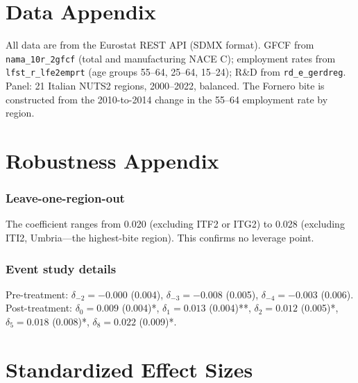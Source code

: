 \documentclass[12pt]{article}
\begin{document}
\section{Data Appendix}

All data are from the Eurostat REST API (SDMX format). GFCF from \texttt{nama\_10r\_2gfcf} (total and manufacturing NACE C); employment rates from \texttt{lfst\_r\_lfe2emprt} (age groups 55--64, 25--64, 15--24); R\&D from \texttt{rd\_e\_gerdreg}. Panel: 21 Italian NUTS2 regions, 2000--2022, balanced. The Fornero bite is constructed from the 2010-to-2014 change in the 55--64 employment rate by region.

\section{Robustness Appendix}

\subsubsection*{Leave-one-region-out} The coefficient ranges from 0.020 (excluding ITF2 or ITG2) to 0.028 (excluding ITI2, Umbria---the highest-bite region). This confirms no leverage point.

\subsubsection*{Event study details} Pre-treatment: $\delta_{-2} = -0.000$ (0.004), $\delta_{-3} = -0.008$ (0.005), $\delta_{-4} = -0.003$ (0.006). Post-treatment: $\delta_0 = 0.009$ (0.004)*, $\delta_1 = 0.013$ (0.004)**, $\delta_2 = 0.012$ (0.005)*, $\delta_5 = 0.018$ (0.008)*, $\delta_8 = 0.022$ (0.009)*.

\section{Standardized Effect Sizes}
\label{sec:sde}


\end{document}
